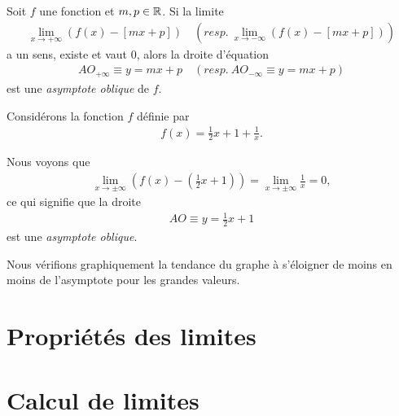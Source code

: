 \documentclass[main.tex]{subfiles}
\begin{document}
\begin{definition}

    Soit $f$ une fonction et $m, p \in \mathbb{R}$.
    Si la limite
    \begin{align*}
        \lim_{x \to +\infty} \left(f(x) - [mx + p]\right)
        \quad \left(resp.\ \lim_{x \to -\infty} \left(f(x) - [mx + p]\right)\right)
    \end{align*}
    a un sens, existe et vaut $0$,
    alors la droite d'équation
    \begin{align}
        AO_{+\infty} \equiv y = mx + p
        \quad \left(resp.\ AO_{-\infty} \equiv y = mx + p\right)
    \end{align}
    est une \emph{asymptote oblique} de $f$.
\end{definition}

\begin{example}

    Considérons la fonction $f$ définie par
    \begin{align}
        f(x) = \frac 1 2 x + 1 + \frac 1 x.
    \end{align}

    Nous voyons que
    \begin{align}
        \lim_{x \to \pm \infty} (f(x) - (\frac 1 2 x + 1)) = \lim_{x \to \pm \infty} \frac 1 x = 0,
    \end{align}
    ce qui signifie que la droite
    \begin{align}
        AO \equiv y = \frac 1 2 x + 1
    \end{align}
    est une \emph{asymptote oblique}.

    Nous vérifions graphiquement la tendance du graphe à s'éloigner de moins en moins de l'asymptote pour les grandes valeurs.
    \begin{center}
        \begin{plot}{0.25}{-12}{-12}{12}{12}
        \end{plot}
    \end{center}
\end{example}

\section{Propriétés des limites}

\section{Calcul de limites}
\end{document}
